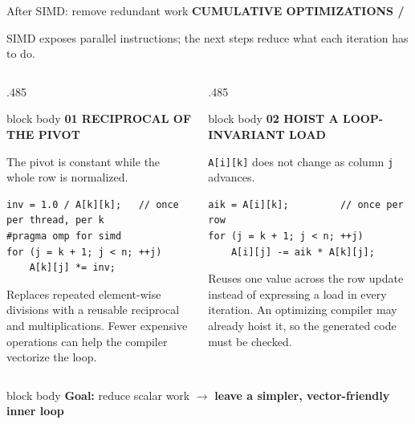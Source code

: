 \documentclass[aspectratio=169,10pt]{beamer}
\newcommand{\eyebrow}[1]{%
  {\color{cyan}\scriptsize\bfseries #1}\par\vspace{.08cm}}
\newcommand{\smallmuted}[1]{{\color{muted}\small #1}}
\newcommand{\cardtitle}[2]{%
  {\color{#1}\bfseries\small #2}\par\vspace{.08cm}}
\begin{document}
\begin{frame}[fragile]{After SIMD: remove redundant work}
  \eyebrow{CUMULATIVE OPTIMIZATIONS \quad / }
  {\smallmuted{SIMD exposes parallel instructions; the next steps reduce what each iteration has to do.}}
  \vspace{.12cm}

  \begin{columns}[T,onlytextwidth]
    \begin{column}{.485\textwidth}
      \begin{beamercolorbox}[rounded=true,sep=.22cm,wd=\textwidth]{block body}
        \cardtitle{coral}{01 \quad RECIPROCAL OF THE PIVOT}
        {\smallmuted{The pivot is constant while the whole row is normalized.}}
        \vspace{.08cm}
\begin{lstlisting}
inv = 1.0 / A[k][k];   // once per thread, per k
#pragma omp for simd
for (j = k + 1; j < n; ++j)
    A[k][j] *= inv;
\end{lstlisting}
        \vspace{.05cm}
        \small Replaces repeated element-wise divisions with a reusable
        reciprocal and multiplications. Fewer expensive operations can help
        the compiler vectorize the loop.
      \end{beamercolorbox}
    \end{column}
    \begin{column}{.485\textwidth}
      \begin{beamercolorbox}[rounded=true,sep=.22cm,wd=\textwidth]{block body}
        \cardtitle{mint}{02 \quad HOIST A LOOP-INVARIANT LOAD}
        {\smallmuted{\texttt{A[i][k]} does not change as column \texttt{j} advances.}}
        \vspace{.08cm}
\begin{lstlisting}
aik = A[i][k];         // once per row
for (j = k + 1; j < n; ++j)
    A[i][j] -= aik * A[k][j];
\end{lstlisting}
        \vspace{.05cm}
        \small Reuses one value across the row update instead of expressing
        a load in every iteration. An optimizing compiler may already hoist
        it, so the generated code must be checked.
      \end{beamercolorbox}
    \end{column}
  \end{columns}

  \vspace{.2cm}
  \begin{beamercolorbox}[rounded=true,sep=.12cm,wd=\textwidth]{block body}
    \centering\small
    \color{cyan}\textbf{Goal:} reduce scalar work \quad
    \color{muted}$\rightarrow$\quad
    \color{mint}\textbf{leave a simpler, vector-friendly inner loop}
  \end{beamercolorbox}
\end{frame}
\end{document}
